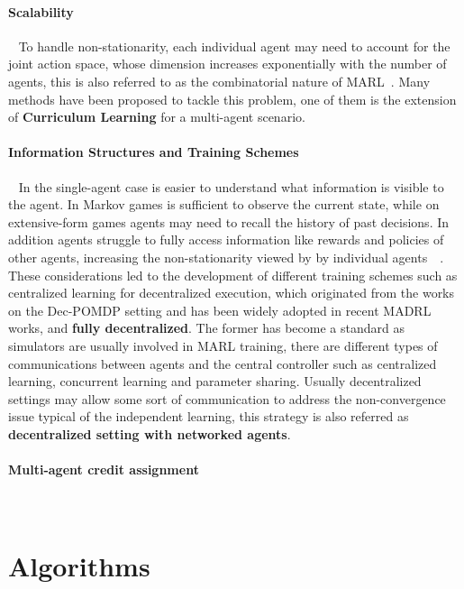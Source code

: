 \documentclass[11pt, a4paper, hidelinks]{report}
\begin{document}
\subsubsection{Scalability}~\newline
To handle non-stationarity, each individual agent may need to account for the joint action space, whose dimension increases exponentially with the number of agents, this is  also referred to as the combinatorial nature of MARL\@~\cite{zhang2019multiagent}.
Many methods have been proposed to tackle this problem, one of them is the extension of \textbf{Curriculum Learning} for a multi-agent scenario.

\subsubsection{Information Structures and Training Schemes}~\newline
In the single-agent case is easier to understand what information is visible to the agent.
In Markov games is sufficient to observe the current state, while on extensive-form games agents may need to recall the history of past decisions.
In addition agents struggle to fully access information like rewards and policies of other agents, increasing the non-stationarity viewed by by individual agents~\cite{Nguyen_2020}~\cite{zhang2019multiagent}.
These considerations led to the development of different training schemes such as centralized learning for decentralized execution, which originated from the works on the Dec-POMDP setting and has been widely adopted in recent MADRL works, and \textbf{fully decentralized}.
The former has become a standard as simulators are usually involved in MARL training, there are different types of communications between agents and the central controller such as centralized learning, concurrent learning and parameter sharing\cite{Nguyen_2020}.
Usually decentralized settings may allow some sort of communication to address the non-convergence issue typical of the independent learning, this strategy is also referred as \textbf{decentralized setting with networked agents}.

\subsubsection{Multi-agent credit assignment}~\newline

\chapter{Algorithms}\label{ch:algorithms}
\end{document}
